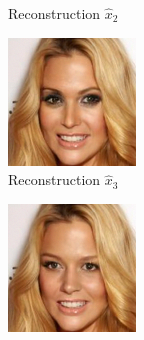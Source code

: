 \begin{figure}
\begin{subfigure}{.135\textwidth}
        \caption{\scriptsize Reconstruction $\hat{x}_2$}
    \end{subfigure}    
    \begin{subfigure}{.135\textwidth}
        \includegraphics[width=\textwidth]{Chapter2/samples/diversity/3.png}
        \caption{\scriptsize Reconstruction $\hat{x}_3$}
    \end{subfigure}    
    \begin{subfigure}{.135\textwidth}
        \includegraphics[width=\textwidth]{Chapter2/samples/diversity/4.png}

\end{subfigure}
\end{figure}

